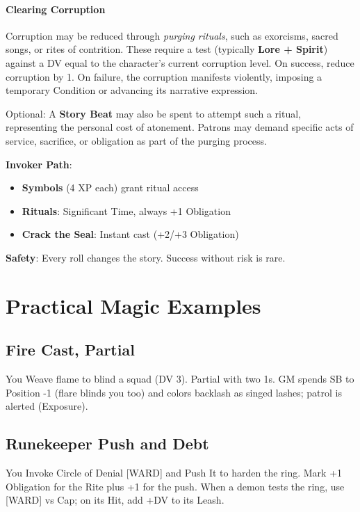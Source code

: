 \begin{tcolorbox}[colback=purple!5!white,colframe=purple!75!black,title=Magic Quick Reference,fonttitle=\bfseries]
\paragraph{Clearing Corruption}
Corruption may be reduced through \textit{purging rituals}, such as exorcisms, sacred songs, or rites of contrition. 
These require a test (typically \textbf{Lore + Spirit}) against a DV equal to the character’s current corruption level.  
On success, reduce corruption by 1. On failure, the corruption manifests violently, imposing a temporary Condition or advancing its narrative expression.  

Optional: A \textbf{Story Beat} may also be spent to attempt such a ritual, representing the personal cost of atonement. Patrons may demand specific acts of service, sacrifice, or obligation as part of the purging process.

\textbf{Invoker Path}:
\begin{itemize}
\item \textbf{Symbols} (4 XP each) grant ritual access
\item \textbf{Rituals}: Significant Time, always +1 Obligation
\item \textbf{Crack the Seal}: Instant cast (+2/+3 Obligation)
\end{itemize}

\textbf{Safety}: Every roll changes the story. Success without risk is rare.
\end{tcolorbox}

\section{Practical Magic Examples} 

\subsection*{Fire Cast, Partial}
You Weave flame to blind a squad (DV 3). Partial with two 1s. GM spends SB to Position -1 (flare blinds you too) and colors backlash as singed lashes; patrol is alerted (Exposure).

\subsection*{Runekeeper Push and Debt}
You Invoke Circle of Denial [WARD] and Push It to harden the ring. Mark +1 Obligation for the Rite plus +1 for the push. When a demon tests the ring, use [WARD] vs Cap; on its Hit, add +DV to its Leash.

